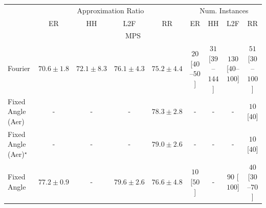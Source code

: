 \begin{tabular}{l|cccc|cccc|}
\toprule
& \multicolumn{4}{c|}{Approximation Ratio} & \multicolumn{4}{c|}{Num. Instances} \\
            & ER & HH & L2F & RR & ER & HH & L2F & RR \\
\midrule
\multicolumn{9}{c}{\rule{0pt}{8pt}MPS} \\
\midrule
Fourier & {\cellcolor[HTML]{FFF1AE}} \color[HTML]{000000} $70.6\pm 1.8$ & {\cellcolor[HTML]{FEE596}} \color[HTML]{000000} $72.1\pm 8.3$ & {\cellcolor[HTML]{FEB23F}} \color[HTML]{000000} $76.1\pm 4.3$ & {\cellcolor[HTML]{FEC14C}} \color[HTML]{000000} $75.2\pm 4.4$ & {\cellcolor[HTML]{FFF5F1}} \color[HTML]{000000} $20$ [$40$--$50$] & {\cellcolor[HTML]{FFF3EF}} \color[HTML]{000000} $31$ [$39$--$144$] & {\cellcolor[HTML]{FDDBD7}} \color[HTML]{000000} $130$ [$40$--$100$] & {\cellcolor[HTML]{FEEEEA}} \color[HTML]{000000} $51$ [$30$--$100$] \\
Fixed Angle (Aer) & {\cellcolor[HTML]{000000}} \color[HTML]{F1F1F1} {\cellcolor{white}} \color{black} - & {\cellcolor[HTML]{000000}} \color[HTML]{F1F1F1} {\cellcolor{white}} \color{black} - & {\cellcolor[HTML]{000000}} \color[HTML]{F1F1F1} {\cellcolor{white}} \color{black} - & {\cellcolor[HTML]{FA8F24}} \color[HTML]{F1F1F1} $78.3\pm 2.8$ & {\cellcolor[HTML]{000000}} \color[HTML]{F1F1F1} {\cellcolor{white}} \color{black} - & {\cellcolor[HTML]{000000}} \color[HTML]{F1F1F1} {\cellcolor{white}} \color{black} - & {\cellcolor[HTML]{000000}} \color[HTML]{F1F1F1} {\cellcolor{white}} \color{black} - & {\cellcolor[HTML]{FFF7F3}} \color[HTML]{000000} $10$ [$40$] \\
Fixed Angle (Aer)$^\star$ & {\cellcolor[HTML]{000000}} \color[HTML]{F1F1F1} {\cellcolor{white}} \color{black} - & {\cellcolor[HTML]{000000}} \color[HTML]{F1F1F1} {\cellcolor{white}} \color{black} - & {\cellcolor[HTML]{000000}} \color[HTML]{F1F1F1} {\cellcolor{white}} \color{black} - & {\cellcolor[HTML]{F5841E}} \color[HTML]{F1F1F1} $79.0\pm 2.6$ & {\cellcolor[HTML]{000000}} \color[HTML]{F1F1F1} {\cellcolor{white}} \color{black} - & {\cellcolor[HTML]{000000}} \color[HTML]{F1F1F1} {\cellcolor{white}} \color{black} - & {\cellcolor[HTML]{000000}} \color[HTML]{F1F1F1} {\cellcolor{white}} \color{black} - & {\cellcolor[HTML]{FFF7F3}} \color[HTML]{000000} $10$ [$40$] \\
Fixed Angle & {\cellcolor[HTML]{FEA030}} \color[HTML]{000000} $77.2\pm 0.9$ & {\cellcolor[HTML]{000000}} \color[HTML]{F1F1F1} {\cellcolor{white}} \color{black} - & {\cellcolor[HTML]{F17B1A}} \color[HTML]{F1F1F1} $79.6\pm 2.6$ & {\cellcolor[HTML]{FEAA38}} \color[HTML]{000000} $76.6\pm 4.8$ & {\cellcolor[HTML]{FFF7F3}} \color[HTML]{000000} $10$ [$50$] & {\cellcolor[HTML]{000000}} \color[HTML]{F1F1F1} {\cellcolor{white}} \color{black} - & {\cellcolor[HTML]{FDE5E2}} \color[HTML]{000000} $90$ [$100$] & {\cellcolor[HTML]{FEF1ED}} \color[HTML]{000000} $40$ [$30$--$70$] \\

\end{tabular}
